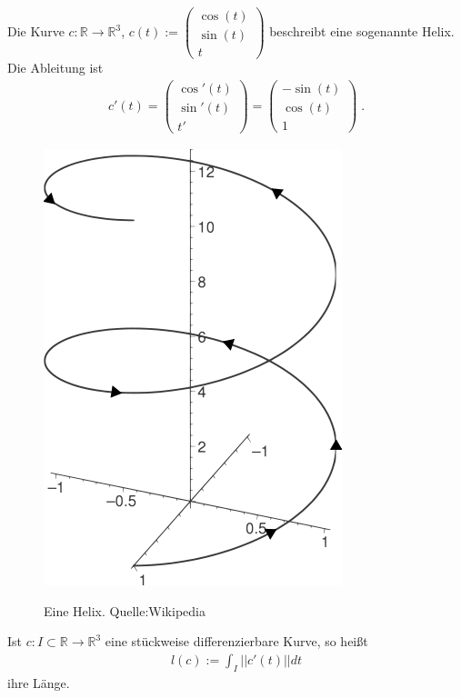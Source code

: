 \begin{Beispiel}
Die Kurve 
$c :  \mathbb{R}   \to  \mathbb{R}^3$, $c(t) :=  \begin{pmatrix} \cos(t) \\  \sin(t) \\  t \end{pmatrix}$
beschreibt eine sogenannte Helix. Die Ableitung ist
\begin{align*}
c'(t) =  \begin{pmatrix} \cos'(t) \\  \sin'(t) \\  t'  \end{pmatrix} = \begin{pmatrix} -\sin(t) \\  \cos(t) \\  1 \end{pmatrix} \;.
\end{align*} 
\end{Beispiel}
\begin{figure}[H]
    \centering
    \includegraphics[scale=0.45]{images/Helix.png}
    \label{fig:helix}
    \caption{Eine Helix. Quelle:Wikipedia}
\end{figure}

\begin{Definition}
Ist $c: I \subset \mathbb{R} \to \mathbb{R}^3$ eine stückweise differenzierbare Kurve, so heißt
\begin{align*}
l(c) := \int_{I} ||c'(t)|| dt
\end{align*}
ihre Länge.
\end{Definition}


